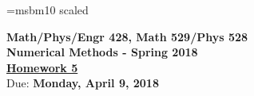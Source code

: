 \documentclass [12pt]{article}
\begin{document}
\def\e{\mathop{\rm e}\nolimits}
\def\abs{\mathop{\rm abs}\nolimits}
\def\sign{\mathop{\rm sign}\nolimits}
\font\bb=msbm10 scaled  %
\def\R{\hbox{\bb R}}

\noindent
\begin{center}
{ \bf  {Math/Phys/Engr 428, Math 529/Phys 528 \\
Numerical Methods - Spring 2018 }}\\[7pt]
\underline{\bf Homework 5}\\

Due: {\bf Monday, April 9, 2018}

\end{center}
\end{document}
